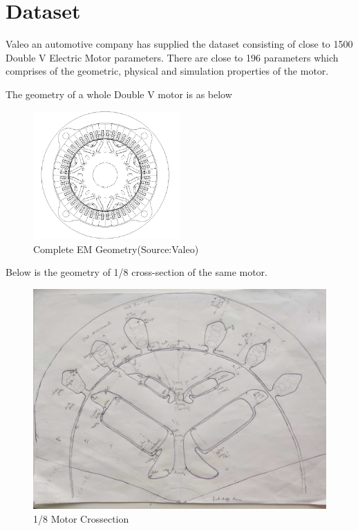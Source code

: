 \documentclass{report} %
\begin{document}
\newpage 

\chapter{Dataset} 
Valeo an automotive company has supplied the dataset consisting of close to 1500 Double V Electric Motor parameters. 
There are close to 196 parameters which comprises of the geometric, physical and simulation properties of the motor.

The geometry of a whole Double V motor is as below

\begin{figure}[H]
    \centering
    \includegraphics[width=0.5\textwidth]{./ReportImages/FullMotorv2.png} 
    \caption{Complete EM Geometry(Source:Valeo)}
    \label{fig:Full Motor}
\end{figure}

Below is the geometry of 1/8 cross-section of the same motor.

\begin{figure}[H]
    \centering
    \includegraphics[width=1\textwidth]{./ReportImages/EMCrosssection.jpg} 
    \caption{1/8 Motor Crossection}
    \label{fig:1/8 Motor Crossection}
\end{figure}
\end{document}
